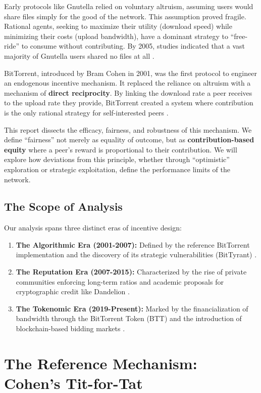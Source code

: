 \documentclass[12pt]{article}
\begin{document}
Early protocols like Gnutella relied on voluntary altruism, assuming users would share files simply for the good of the network. This assumption proved fragile. Rational agents, seeking to maximize their utility (download speed) while minimizing their costs (upload bandwidth), have a dominant strategy to ``free-ride'' to consume without contributing. By 2005, studies indicated that a vast majority of Gnutella users shared no files at all \cite{Adar2000}.

BitTorrent, introduced by Bram Cohen in 2001, was the first protocol to engineer an endogenous incentive mechanism. It replaced the reliance on altruism with a mechanism of \textbf{direct reciprocity}. By linking the download rate a peer receives to the upload rate they provide, BitTorrent created a system where contribution is the only rational strategy for self-interested peers \cite{Cohen2003}.

This report dissects the efficacy, fairness, and robustness of this mechanism. We define ``fairness'' not merely as equality of outcome, but as \textbf{contribution-based equity} where a peer's reward is proportional to their contribution. We will explore how deviations from this principle, whether through ``optimistic'' exploration or strategic exploitation, define the performance limits of the network.

\subsection{The Scope of Analysis}
Our analysis spans three distinct eras of incentive design:
\begin{enumerate}
    \item \textbf{The Algorithmic Era (2001-2007):} Defined by the reference BitTorrent implementation and the discovery of its strategic vulnerabilities (BitTyrant) \cite{Piatek2007}.
    \item \textbf{The Reputation Era (2007-2015):} Characterized by the rise of private communities enforcing long-term ratios \cite{Meulpolder2009} and academic proposals for cryptographic credit like Dandelion \cite{Sirivianos2007}.
    \item \textbf{The Tokenomic Era (2019-Present):} Marked by the financialization of bandwidth through the BitTorrent Token (BTT) and the introduction of blockchain-based bidding markets \cite{BTTWhitepaper}.
\end{enumerate}

\section{The Reference Mechanism: Cohen's Tit-for-Tat}
\end{document}
